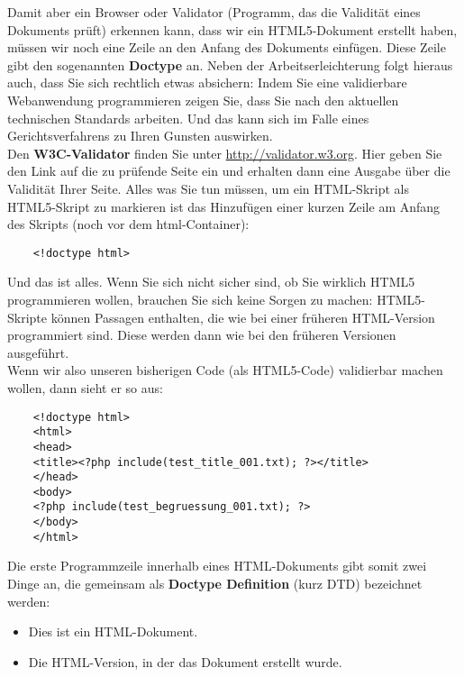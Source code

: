 Damit aber ein Browser oder Validator (Programm, das die Validität eines Dokuments prüft) erkennen kann, dass wir ein HTML5-Dokument erstellt haben, müssen wir noch eine Zeile an den Anfang des Dokuments einfügen. Diese Zeile gibt den sogenannten \textbf{Doctype} an. Neben der Arbeitserleichterung folgt hieraus auch, dass Sie sich rechtlich etwas absichern: Indem Sie eine validierbare Webanwendung programmieren zeigen Sie, dass Sie nach den aktuellen technischen Standards arbeiten. Und das kann sich im Falle eines Gerichtsverfahrens zu Ihren Gunsten auswirken.\\

Den \textbf{W3C-Validator} finden Sie unter \url{http://validator.w3.org}. Hier geben Sie den Link auf die zu prüfende Seite ein und erhalten dann eine Ausgabe über die Validität Ihrer Seite. Alles was Sie tun müssen, um ein HTML-Skript als HTML5-Skript zu markieren ist das Hinzufügen einer kurzen Zeile am Anfang des Skripts (noch vor dem html-Container):\\

\begin{verbatim}
	<!doctype html>
\end{verbatim}

Und das ist alles. Wenn Sie sich nicht sicher sind, ob Sie wirklich HTML5 programmieren wollen, brauchen Sie sich keine Sorgen zu machen: HTML5-Skripte können Passagen enthalten, die wie bei einer früheren HTML-Version programmiert sind. Diese werden dann wie bei den früheren Versionen ausgeführt.\\

Wenn wir also unseren bisherigen Code (als HTML5-Code) validierbar machen wollen, dann sieht er so aus:

\begin{verbatim}
	<!doctype html>
	<html>
	<head>
	<title><?php include(test_title_001.txt); ?></title>
	</head>
	<body>
	<?php include(test_begruessung_001.txt); ?>
	</body>
	</html>
\end{verbatim}

Die erste Programmzeile innerhalb eines HTML-Dokuments gibt somit zwei Dinge an, die gemeinsam als \textbf{Doctype Definition} (kurz DTD) bezeichnet werden:

\begin{itemize}
	\item Dies ist ein HTML-Dokument.
	\item Die HTML-Version, in der das Dokument erstellt wurde.
\end{itemize}

